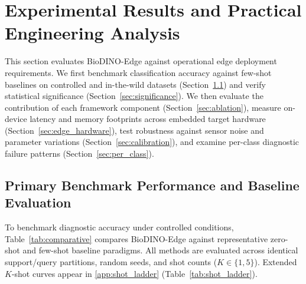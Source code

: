 \section{Experimental Results and Practical Engineering Analysis}
\label{sec:results}

This section evaluates BioDINO-Edge against operational edge deployment requirements. We first benchmark classification accuracy against few-shot baselines on controlled and in-the-wild datasets (Section~\ref{sec:comparative_results}) and verify statistical significance (Section~\ref{sec:significance}). We then evaluate the contribution of each framework component (Section~\ref{sec:ablation}), measure on-device latency and memory footprints across embedded target hardware (Section~\ref{sec:edge_hardware}), test robustness against sensor noise and parameter variations (Section~\ref{sec:calibration}), and examine per-class diagnostic failure patterns (Section~\ref{sec:per_class}).

\subsection{Primary Benchmark Performance and Baseline Evaluation}
\label{sec:comparative_results}

To benchmark diagnostic accuracy under controlled conditions, Table~\ref{tab:comparative} compares BioDINO-Edge against representative zero-shot and few-shot baseline paradigms. All methods are evaluated across identical support/query partitions, random seeds, and shot counts ($K \in \{1, 5\}$). Extended $K$-shot curves appear in \ref{app:shot_ladder} (Table~\ref{tab:shot_ladder}).

